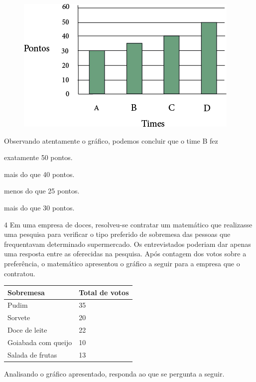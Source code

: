 \begin{figure}[htpb!]
\centering
\includegraphics[width=.9\textwidth]{media/image43.png}
\end{figure}

Observando atentamente o gráfico, podemos concluir que o time B fez

\begin{escolha}
\item
  exatamente 50 pontos.
\item
  mais do que 40 pontos.
\item
  menos do que 25 pontos.
\item
  mais do que 30 pontos.
\end{escolha}


\num{4} Em uma empresa de doces, resolveu-se contratar um matemático que realizasse uma
pesquisa para verificar o tipo preferido de sobremesa das pessoas que
frequentavam determinado supermercado. Os entrevistados poderiam dar
apenas uma resposta entre as oferecidas na pesquisa. Após contagem dos
votos sobre a preferência, o matemático apresentou o gráfico a seguir
para a empresa que o contratou.

\begin{longtable}[]{@{}ll@{}}
\toprule
Sobremesa & Total de votos\tabularnewline
\midrule
\endhead
Pudim & 35\tabularnewline
Sorvete & 20\tabularnewline
Doce de leite & 22\tabularnewline
Goiabada com queijo & 10\tabularnewline
Salada de frutas & 13\tabularnewline
\bottomrule
\end{longtable}

Analisando o gráfico apresentado, responda ao que se pergunta a seguir.

